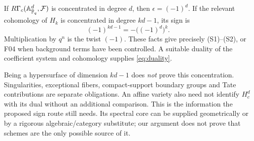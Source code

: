 \documentclass[11pt,a4paper]{article}
\newcommand{\A}{\mathbb A}\newcommand{\PP}{\mathbb P}\newcommand{\GL}{\mathrm{GL}}
\newcommand{\fid}[1]{\textsf{#1}}\newcommand{\gate}[1]{\textsf{#1}}
\theoremstyle{named}\newtheorem{finding}{Finding}[section]
\theoremstyle{definition}\newtheorem{definition}[finding]{Definition}
\theoremstyle{remark}\newtheorem{remark}[finding]{Remark}
\begin{document}
If $R\Gamma_c(\A^d_{\bar{\F}_q},\mathcal F)$ is concentrated in degree $d$, then $\epsilon=(-1)^d$. If the relevant cohomology of $H_k$ is concentrated in degree $kd-1$, its sign is
\[
 (-1)^{kd-1}=-\bigl((-1)^d\bigr)^k.
\]
Multiplication by $q^n$ is the twist $(-1)$. These facts give precisely (S1)--(S2), or \fid{F04} when background terms have been controlled. A suitable duality of the coefficient system and cohomology supplies \eqref{eq:duality}.

Being a hypersurface of dimension $kd-1$ does \emph{not} prove this concentration. Singularities, exceptional fibers, compact-support boundary groups and Tate contributions are separate obligations. An affine variety also need not identify $H_c^d$ with its dual without an additional comparison. This is the information the proposed sign route still needs. Its spectral core can be supplied geometrically or by a rigorous algebraic/category substitute; our argument does not prove that schemes are the only possible source of it.
\end{document}

